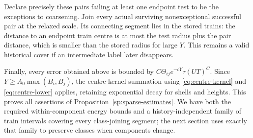 Declare precisely these pairs failing at least one endpoint test to
be the exceptions to coarsening.  Join every actual surviving
nonexceptional successful pair at the relaxed scale.  Its connecting
segment lies in the stored trains: the distance to an endpoint train
centre is at most the test radius plus the pair distance, which is
smaller than the stored radius for large $Y$.  This remains a valid
historical cover if an intermediate label later disappears.

Finally, every error obtained above is bounded by
$C\Theta_{ij}e^{-cY}\tau(UT)^C$.  Since
$Y\ge A_0\max(B_i,B_j)$, the centre-kernel summation using
\eqref{eq:centre-kernel} and \eqref{eq:centre-lower} applies, retaining
exponential decay for shells and heights.  This proves all assertions
of Proposition~\ref{sp:sparse-estimates}.  We have both the required
within-component energy bounds and a history-independent family of
train intervals covering every class-joining segment; the next section
uses exactly that family to preserve classes when components change.
